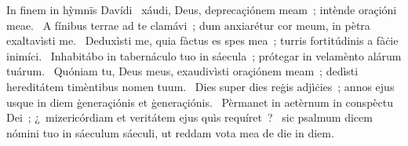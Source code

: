 { In finem in hỳmnïs Davídi}
{%
~xáudi, Deus, deprecaçiónem meam~; intènde oraçióni meae. 
~A fínibus terrae ad te clamávi~; dum anxiarétur cor meum, in pètra exaltavìsti me. 
~Deduxìsti me, quia fàctus es spes mea~; turris fortitúdinis a fàċie inimíci. 
~Inhabitábo in tabernáculo tuo in sáecula~; prótegar in velamènto alárum tuárum. 
~Quóniam tu, Deus meus, exaudivìsti oraçiónem meam~; dedìsti hereditátem timèntibus nomen tuum. 
~Dies super dies reġis adjìċies~; annos ejus usque in diem ġeneraçiónis et ġeneraçiónis. 
~Pèrmanet in aetèrnum in conspèctu Dei~; ¿~mizericórdiam et veritátem ejus quìs requíret~? 
~sic psalmum dicem nómini tuo in sáeculum sáeculi, ut reddam vota mea de die in diem. 
}
